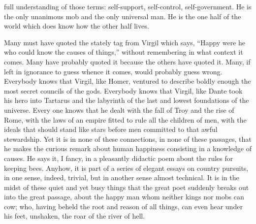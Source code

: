 \documentclass{book}
\begin{document}
full understanding of those terms: self-support, self-control, self-government. He is the only unanimous mob and the only universal man. He is the one half of the world which does know how the other half lives.

Many must have quoted the stately tag from Virgil which says, “Happy were he who could know the causes of things,” without remembering in what context it comes. Many have probably quoted it because the others have quoted it. Many, if left in ignorance to guess whence it comes, would probably guess wrong. Everybody knows that Virgil, like Homer, ventured to describe boldly enough the most secret councils of the gods. Everybody knows that Virgil, like Dante took his hero into Tartarus and the labyrinth of the last and lowest foundations of the universe. Every one knows that he dealt with the fall of Troy and the rise of Rome, with the laws of an empire fitted to rule all the children of men, with the ideals that should stand like stars before men committed to that awful stewardship. Yet it is in none of these connections, in none of these passages, that he makes the curious remark about human happiness consisting in a knowledge of causes. He says it, I fancy, in a pleasantly didactic poem about the rules for keeping bees. Anyhow, it is part of a series of elegant essays on country pursuits, in one sense, indeed, trivial, but in another sense almost technical. It is in the midst of these quiet and yet busy things that the great poet suddenly breaks out into the great passage, about the happy man whom neither kings nor mobs can cow; who, having beheld the root and reason of all things, can even hear under his feet, unshaken, the roar of the river of hell.
\end{document}
